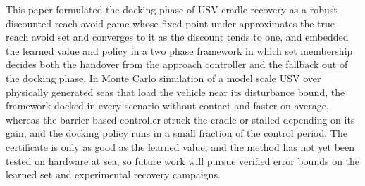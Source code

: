 \documentclass[5p,times,authoryear]{elsarticle}
\begin{document}
This paper formulated the docking phase of USV cradle recovery as a robust discounted reach avoid game whose fixed point under approximates the true reach avoid set and converges to it as the discount tends to one, and embedded the learned value and policy in a two phase framework in which set membership decides both the handover from the approach controller and the fallback out of the docking phase. In Monte Carlo simulation of a model scale USV over physically generated seas that load the vehicle near its disturbance bound, the framework docked in every scenario without contact and faster on average, whereas the barrier based controller struck the cradle or stalled depending on its gain, and the docking policy runs in a small fraction of the control period. The certificate is only as good as the learned value, and the method has not yet been tested on hardware at sea, so future work will pursue verified error bounds on the learned set and experimental recovery campaigns.
\end{document}
